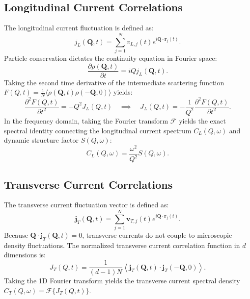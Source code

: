 \documentclass[11pt,a4paper]{article}
\begin{document}
\subsection{Longitudinal Current Correlations}
The longitudinal current fluctuation is defined as:
\begin{equation}
j_L(\mathbf{Q},t) = \sum_{j=1}^N v_{L,j}(t) e^{i \mathbf{Q} \cdot \mathbf{r}_j(t)}.
\end{equation}
Particle conservation dictates the continuity equation in Fourier space:
\begin{equation}
\frac{\partial \rho(\mathbf{Q},t)}{\partial t} = i Q j_L(\mathbf{Q},t).
\end{equation}
Taking the second time derivative of the intermediate scattering function $F(Q,t) = \frac{1}{N} \langle \rho(\mathbf{Q},t) \rho(-\mathbf{Q},0) \rangle$ yields:
\begin{equation}
\frac{\partial^2 F(Q,t)}{\partial t^2} = - Q^2 J_L(Q,t) \quad \implies \quad J_L(Q,t) = -\frac{1}{Q^2} \frac{\partial^2 F(Q,t)}{\partial t^2}.
\end{equation}
In the frequency domain, taking the Fourier transform $\mathcal{F}$ yields the exact spectral identity connecting the longitudinal current spectrum $C_L(Q,\omega)$ and dynamic structure factor $S(Q,\omega)$:
\begin{equation}
C_L(Q,\omega) = \frac{\omega^2}{Q^2} S(Q,\omega).
\end{equation}

\subsection{Transverse Current Correlations}
The transverse current fluctuation vector is defined as:
\begin{equation}
\mathbf{j}_T(\mathbf{Q},t) = \sum_{j=1}^N \mathbf{v}_{T,j}(t) e^{i \mathbf{Q} \cdot \mathbf{r}_j(t)}.
\end{equation}
Because $\mathbf{Q} \cdot \mathbf{j}_T(\mathbf{Q},t) = 0$, transverse currents do not couple to microscopic density fluctuations. The normalized transverse current correlation function in $d$ dimensions is:
\begin{equation}
J_T(Q,t) = \frac{1}{(d-1) N} \left\langle \mathbf{j}_T(\mathbf{Q},t) \cdot \mathbf{j}_T(-\mathbf{Q},0) \right\rangle.
\end{equation}
Taking the 1D Fourier transform yields the transverse current spectral density $C_T(Q,\omega) = \mathcal{F}\{J_T(Q,t)\}$.
\end{document}
